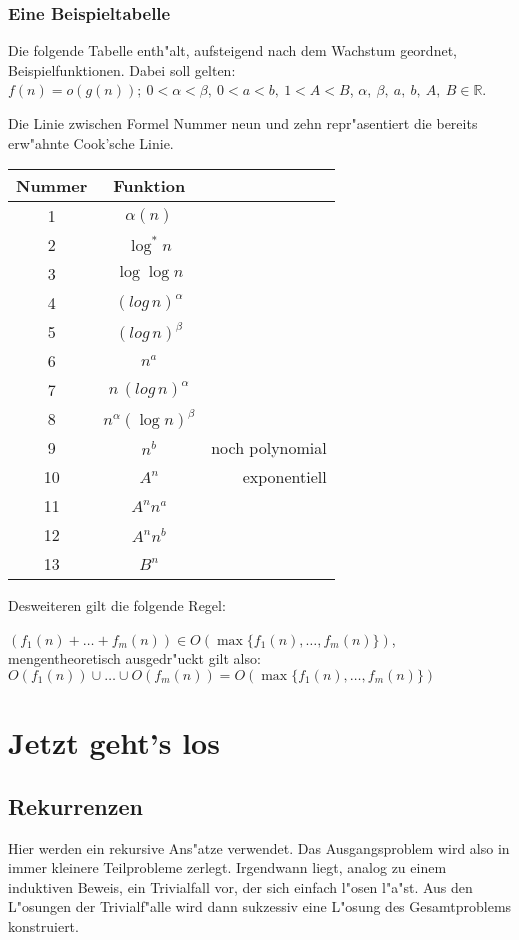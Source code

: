 \documentclass[draft,12pt]{scrreprt}
\theoremstyle{break}
\begin{document}
\subsection{Eine Beispieltabelle}
Die folgende Tabelle enth"alt, aufsteigend nach dem Wachstum geordnet, Beispielfunktionen.
Dabei soll gelten: $f(n)=o(g(n));\ 0 < \alpha < \beta,\ 0<a<b,\ 1<A<B$,
$\alpha,\ \beta,\ a,\ b, \ A,\ B \in \mathbb{R}$.

Die Linie zwischen Formel Nummer neun und zehn repr"asentiert die bereits erw"ahnte Cook'sche Linie.
\bigskip

\begin{table}[h]
\begin{tabular}{c|cr}
    Nummer      &Funktion       \\ \hline
    1   &       $\alpha (n)$    \\
    2   &       $\log^{*}n$     \\
    3   &       $\log \log n $  \\
    4   &       ${(log \, n)}^{\alpha}$ \\
    5   &       ${(log \, n)}^{\beta}$  \\
    6   &       $n^a$           \\
    7   &       $n \, (log \, n)^{\alpha}$      \\
    8   &       $n^{\alpha}{(\log n)}^{\beta}$  \\
    9   &       $n^b$           & noch polynomial\\ \hline
    10  &       $A^n$           & exponentiell\\
    11  &       $A^n n^a$       \\
    12  &       $A^n n^b$       \\
    13  &       $B^n$           
\end{tabular}
\end{table}

Desweiteren gilt die folgende Regel:

\noindent
$(f_1(n)+ \dots +f_m(n)) \in O (\max\{f_1(n),\dots,f_m(n)\})$, mengentheoretisch ausgedr"uckt gilt also: $O(f_1(n)) \cup \dots
\cup O(f_m(n)) = O (\max\{f_1(n),\dots,f_m(n)\})$


\chapter{Jetzt geht's los}

\section{Rekurrenzen}
Hier werden ein rekursive Ans"atze verwendet. Das Ausgangsproblem wird also in immer kleinere Teilprobleme zerlegt.
Irgendwann liegt, analog zu einem induktiven Beweis, ein Trivialfall vor, der sich einfach l"osen l"a"st. Aus den L"osungen der Trivialf"alle
wird dann sukzessiv eine L"osung des Gesamtproblems konstruiert.
\end{document}
